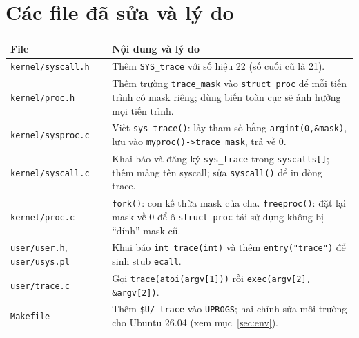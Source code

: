 \documentclass[12pt,a4paper]{article}
\newcommand{\code}[1]{\texttt{#1}}
\begin{document}
\section{Các file đã sửa và lý do}
\begin{center}
\small
\begin{tabular}{@{}l p{10.2cm}@{}}
\toprule
\textbf{File} & \textbf{Nội dung và lý do} \\
\midrule
\code{kernel/syscall.h} & Thêm \code{SYS\_trace} với số hiệu 22 (số cuối cũ là 21). \\
\code{kernel/proc.h} & Thêm trường \code{trace\_mask} vào \code{struct proc} để mỗi tiến trình có mask riêng; dùng biến toàn cục sẽ ảnh hưởng mọi tiến trình. \\
\code{kernel/sysproc.c} & Viết \code{sys\_trace()}: lấy tham số bằng \code{argint(0,\&mask)}, lưu vào \code{myproc()->trace\_mask}, trả về 0. \\
\code{kernel/syscall.c} & Khai báo và đăng ký \code{sys\_trace} trong \code{syscalls[]}; thêm mảng tên syscall; sửa \code{syscall()} để in dòng trace. \\
\code{kernel/proc.c} & \code{fork()}: con kế thừa mask của cha. \code{freeproc()}: đặt lại mask về 0 để ô \code{struct proc} tái sử dụng không bị ``dính'' mask cũ. \\
\code{user/user.h}, \code{user/usys.pl} & Khai báo \code{int trace(int)} và thêm \code{entry("trace")} để sinh stub \code{ecall}. \\
\code{user/trace.c} & Gọi \code{trace(atoi(argv[1]))} rồi \code{exec(argv[2], \&argv[2])}. \\
\code{Makefile} & Thêm \code{\$U/\_trace} vào \code{UPROGS}; hai chỉnh sửa môi trường cho Ubuntu 26.04 (xem mục~\ref{sec:env}). \\
\bottomrule
\end{tabular}
\end{center}

\end{document}
